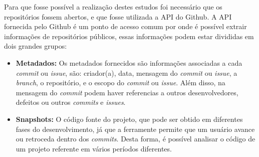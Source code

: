 Para que fosse possível a realização destes estudos foi necessário que os repositórios fossem abertos, e que fosse utilizada a API do Github. A API fornecida pelo Github é um ponto de acesso comum por onde é possível extrair informações de repositórios públicos, essas informações podem estar divididas em dois grandes grupos:

\begin{itemize}
    \item \textbf{Metadados:} Os metadados fornecidos são informações associadas a cada \textit{commit} ou \textit{issue}, são: criador(a), data, mensagem do \textit{commit} ou \textit{issue}, a \textit{branch}, o repositório, e o escopo do \textit{commit} ou \textit{issue}. Além disso, na mensagem do \textit{commit} podem haver referencias a outros desenvolvedores, defeitos ou outros \textit{commits} e \textit{issues}.
    \item \textbf{Snapshots:} O código fonte do projeto, que pode ser obtido em diferentes fases do desenvolvimento, já que a ferramente permite que um usuário avance ou retroceda dentro dos \textit{commits}. Desta forma, é possível analisar o código de um projeto referente em vários períodos diferentes.
\end{itemize}

